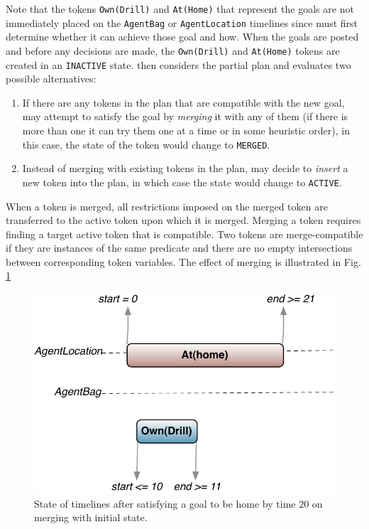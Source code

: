\begin{description}
  Note that the tokens \texttt{Own(Drill)} and \texttt{At(Home)} that
  represent the goals are not immediately placed on the
  \texttt{AgentBag} or \texttt{AgentLocation} timelines since \eu must
  first determine whether it can achieve those goal and how. When the
  goals are posted and before any decisions are made, the
  \texttt{Own(Drill)} and \texttt{At(Home)} tokens are created in an
  \texttt{INACTIVE} state. \eu then considers the partial plan and
  evaluates two possible alternatives:

\begin{enumerate}

\item If there are any tokens in the plan that are compatible with the
  new goal, \eu may attempt to satisfy the goal by \emph{merging} it
  with any of them (if there is more than one it can try them one at a
  time or in some heuristic order), in this case, the state of the
  token would change to \texttt{MERGED}.

\item Instead of merging with existing tokens in the plan, \eu may
  decide to \emph{insert} a new token into the plan, in which case the
  state would change to \texttt{ACTIVE}.

\end{enumerate}

When a token is merged, all restrictions imposed on the merged token
are transferred to the active token upon which it is merged. Merging a
token requires finding a target active token that is compatible. Two
tokens are merge-compatible if they are instances of the same
predicate and there are no empty intersections between corresponding
token variables.  The effect of merging is illustrated in
Fig. \ref{fig:europapr:merge}

\begin{figure} 
  \centering
  \includegraphics[scale=0.4]{figs/europa-pr-merge.pdf}
  \caption{\small State of timelines after satisfying a goal to be
    home by time $20$ on merging with initial state.}
  \label{fig:europapr:merge}
\end{figure}


\end{description}
